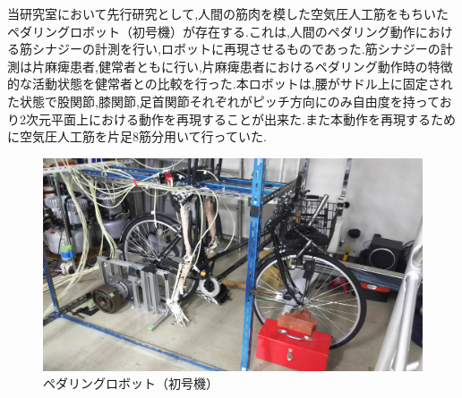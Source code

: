 当研究室において先行研究として,人間の筋肉を模した空気圧人工筋をもちいたペダリングロボット（初号機）が存在する.これは,人間のペダリング動作における筋シナジーの計測を行い,ロボットに再現させるものであった.筋シナジーの計測は片麻痺患者,健常者ともに行い,片麻痺患者におけるペダリング動作時の特徴的な活動状態を健常者との比較を行った.本ロボットは,腰がサドル上に固定された状態で股関節,膝関節,足首関節それぞれがピッチ方向にのみ自由度を持っており2次元平面上における動作を再現することが出来た.また本動作を再現するために空気圧人工筋を片足8筋分用いて行っていた.
\begin{figure}[h]
 \begin{center}
  \includegraphics[width=0.75\columnwidth,clip]{Photo/BackGround/1st.eps}
  \caption{ペダリングロボット（初号機）}
  \label{初号機}
  \end{center}
\end{figure}

